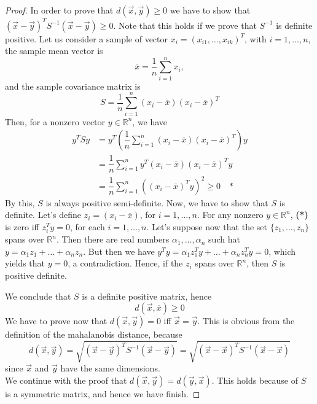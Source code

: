 \documentclass[11pt]{article}
\theoremstyle{definition}
\theoremstyle{remark}
\theoremstyle{remark}
\theoremstyle{remark}
\begin{document}
\begin{proof}
  In order to prove that $d(\vec{x},\vec{y}) \geq 0$ we have to show that
  $(\vec{x} - \vec{y})^{T}S^{-1}(\vec{x}-\vec{y})\geq 0$. Note that this holds
  if we prove that $S^{-1}$ is definite positive. Let us consider a sample of
  vector $x_{i} = (x_{i1},\ldots,x_{ik})^{T}$, with $i = 1,\ldots,n$, the sample
  mean vector is
  \[
    \overline{x} = \dfrac{1}{n} \sum_{i = 1}^{n} x_{i},
  \]
  and the sample covariance matrix is
  \[
    S = \dfrac{1}{n} \sum_{i = 1}^{n} (x_{i} - \overline{x})(x_{i}- \overline{x})^{T}
  \]
  Then, for a nonzero vector $y \in \mathbb{R}^{n}$, we have
  \begin{align*}
    y^{T}S y &= y^{T} \left ( \dfrac{1}{n} \sum_{i = 1}^{n} (x_{i} - \overline{x})(x_{i}- \overline{x})^{T} \right) y \\
             &= \dfrac{1}{n} \sum_{i = 1}^{n} y^{T} (x_{i} - \overline{x})(x_{i} - \overline{x})^{T} y \\
             &= \dfrac{1}{n} \sum_{i = 1}^{n} ((x_{i} - \overline{x})^{T}y)^{2} \geq 0 \quad \textbf{*}
  \end{align*}
  By this, $S$ is always positive semi-definite. Now, we have to show that $S$
  is definite. Let's define $z_{i} = (x_{i} - \overline{x})$, for
  $i = 1,\ldots,n$. For any nonzero $y \in \mathbb{R}^{n}$, \textbf{(*)} is zero
  iff $z_{i}^{T}y = 0$, for each $i = 1,\ldots,n$. Let's suppose now that the
  set $\{z_{1},\ldots,z_{n}\}$ spans over $\mathbb{R}^{n}$. Then there are real
  numbers $\alpha_{1},\ldots,\alpha_{n}$ such hat
  $y = \alpha_{1}z_{1} + \ldots + \alpha_{n}z_{n}$. But then we have
  $y^{T}y = \alpha_{1}z_{1}^{T}y + \ldots + \alpha_{n}z_{n}^{T}y = 0$, which
  yields that $y = 0$, a contradiction. Hence, if the $z_{i}$ spans over
  $\mathbb{R}^{n}$, then $S$ is positive definite.

  We conclude that $S$ is a definite positive matrix, hence
  \[
    d(\vec{x},\overline{x}) \geq 0
  \]
  We have to prove now that $d(\vec{x},\vec{y}) = 0$ iff $\vec{x} = \vec{y}$.
  This is obvious from the definition of the mahalanobis distance, because
  \[
    d(\vec{x},\vec{y}) = \sqrt{(\vec{x} - \vec{y})^{T}S^{-1}(\vec{x}-\vec{y})} = \sqrt{(\vec{x} - \vec{x})^{T}S^{-1}(\vec{x}-\vec{x})}
  \]
  since $\vec{x}$ and $\vec{y}$ have the same dimensions. \\

  We continue with the proof that $d(\vec{x},\vec{y}) = d(\vec{y},\vec{x})$.
  This holds because of $S$ is a symmetric matrix, and hence we have finish.


\end{proof}
\end{document}
